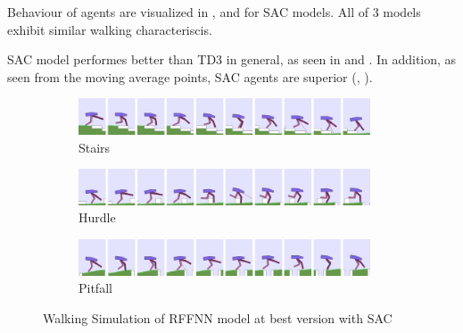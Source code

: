 Behaviour of agents are visualized in ,  and  for SAC models. 
All of 3 models exhibit similar walking characteriscis.

SAC model performes better than TD3 in general, as seen in  and . 
In addition, as seen from the moving average points, SAC agents are superior (, ).

\begin{figure}[!ht]
	\centering
	\begin{subfigure}{.95\textwidth}
		\centering
		\includegraphics[width=0.95\textwidth]{figures/bipedal/anim/ff-stairs.png}
		\caption{Stairs}
		\label{fig:anim_rffnn_stairs}
	\end{subfigure}
	\begin{subfigure}{.95\textwidth}
		\centering
		\includegraphics[width=0.95\textwidth]{figures/bipedal/anim/ff-hurdle.png}
		\caption{Hurdle}
		\label{fig:anim_rffnn_hurdle}
	\end{subfigure}
	\begin{subfigure}{.95\textwidth}
		\centering
		\includegraphics[width=0.95\textwidth]{figures/bipedal/anim/ff-pitfall.png}
		\caption{Pitfall}
		\label{fig:anim_rffnn_pitfall}
	\end{subfigure}
	\caption{Walking Simulation of RFFNN model at best version with SAC}
	\label{fig:rffnn_simulation}
\end{figure}

